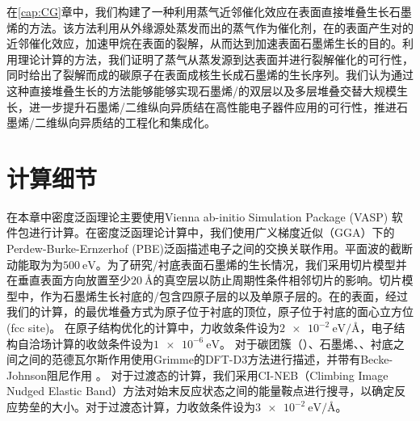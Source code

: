 在\ref{cap:CG}章中，我们构建了一种利用蒸气近邻催化效应在表面直接堆叠生长石墨烯的方法。该方法利用从外缘源处蒸发而出的蒸气作为催化剂，在的表面产生对的近邻催化效应，加速甲烷在表面的裂解，从而达到加速表面石墨烯生长的目的。利用理论计算的方法，我们证明了蒸气从蒸发源到达表面并进行裂解催化的可行性，同时给出了裂解而成的碳原子在表面成核生长成石墨烯的生长序列。我们认为通过这种直接堆叠生长的方法能够能够实现石墨烯/的双层以及多层堆叠交替大规模生长，进一步提升石墨烯/二维纵向异质结在高性能电子器件应用的可行性，推进石墨烯/二维纵向异质结的工程化和集成化。

\section{计算细节}

在本章中密度泛函理论主要使用Vienna ab-initio Simulation Package (VASP) 软件包进行计算。在密度泛函理论计算中，我们使用广义梯度近似（GGA）下的 Perdew-Burke-Ernzerhof (PBE)泛函描述电子之间的交换关联作用。平面波的截断动能取为为$\SI{500}{\electronvolt}$。为了研究/衬底表面石墨烯的生长情况，我们采用切片模型并在垂直表面方向放置至少$\SI{20}{\angstrom}$的真空层以防止周期性条件相邻切片的影响。切片模型中，作为石墨烯生长衬底的/包含四原子层的以及单原子层的。在的表面，经过我们的计算，的最优堆叠方式为原子位于衬底的顶位，原子位于衬底的面心立方位(fcc site)。
在原子结构优化的计算中，力收敛条件设为$\SI{2e-2}{\electronvolt \per \angstrom}$，电子结构自洽场计算的收敛条件设为$\SI{1e-6}{\electronvolt}$。
对于碳团簇（）、石墨烯、、衬底之间之间的范德瓦尔斯作用使用Grimme的DFT-D3方法进行描述，并带有Becke-Johnson阻尼作用 。
对于过渡态的计算，我们采用CI-NEB（Climbing Image Nudged Elastic Band）方法对始末反应状态之间的能量鞍点进行搜寻，以确定反应势垒的大小。对于过渡态计算，力收敛条件设为$\SI{3e-2}{\electronvolt \per \angstrom}$。

